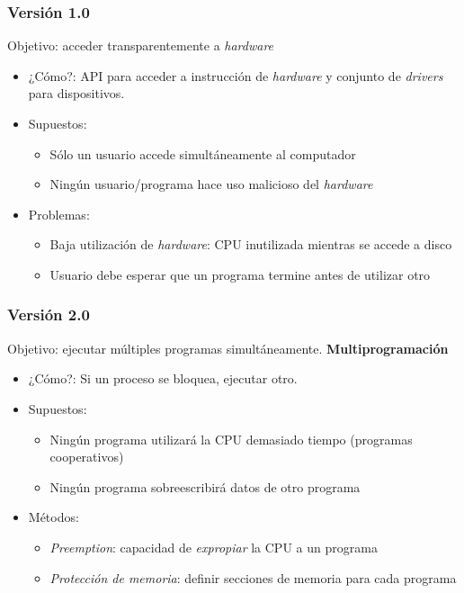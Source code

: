 \documentclass[letter]{beamer}
\begin{document}
\begin{frame}
  \frametitle{Versión 1.0}

  Objetivo: acceder transparentemente a {\em hardware}
  \begin{itemize}
  \item<2-> ¿Cómo?: API para acceder a instrucción de {\em hardware} y conjunto de {\em drivers}
        para dispositivos.
  \item<3-> Supuestos:
    \begin{itemize}
      \item Sólo un usuario accede simultáneamente al computador
      \item Ningún usuario/programa hace uso malicioso del {\em hardware}
    \end{itemize}
  \item<4-> Problemas:
    \begin{itemize}
      \item Baja utilización de {\em hardware}: CPU inutilizada mientras se accede a disco
      \item Usuario debe esperar que un programa termine antes de utilizar otro
    \end{itemize}
  \end{itemize}
\end{frame}
\begin{frame}
  \frametitle{Versión 2.0}

  Objetivo: ejecutar múltiples programas simultáneamente. {\bf Multiprogramación}
  \begin{itemize}
  \item<2-> ¿Cómo?: Si un proceso se bloquea, ejecutar otro.
  \item<3-> Supuestos:
    \begin{itemize}
      \item Ningún programa utilizará la CPU demasiado tiempo (programas cooperativos)
      \item Ningún programa sobreescribirá datos de otro programa
    \end{itemize}
  \item<4-> Métodos:
    \begin{itemize}
      \item {\em Preemption}: capacidad de {\em expropiar} la CPU a un programa
      \item {\em Protección de memoria}: definir secciones de memoria para cada programa
    \end{itemize}
  \end{itemize}
\end{frame}
\end{document}

